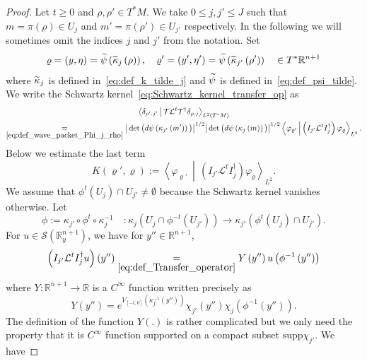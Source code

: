 \documentclass[AHL,Unicode,longabstracts,published]{cedram}
\newcommand{\clS}{\mathcal{S}}
\newcommand{\clT}{\mathcal{T}}
\newcommand{\clL}{\mathcal{L}}
\newcommand{\supp}{\mathrm{supp}}
\newcommand{\bbR}{\mathbb{R}}
\let\oldtilde\tilde
\renewcommand*{\tilde}[1]{\mathchoice{\widetilde{#1}}{\widetilde{#1}}{\oldtilde{#1}}{\oldtilde{#1}}}
\newcommand{\bbR}{\mathbb{R}}
\begin{document}
\begin{proof}
Let $t\geq0$ and $\rho,\rho'\in T^{*}M$. We take $0\leq j,j'\leq J$ such that $m=\pi(\rho)\in U_{j}$ and $m'=\pi(\rho')\in U_{j'}$ respectively. In the following we will sometimes omit the indices $j$ and $j'$ from the notation. Set
\[
\varrho=\left(y,\eta\right)=\tilde{\psi}\left(\tilde{\kappa}_{j}\left(\rho\right)\right),\quad\varrho'=\left(y',\eta'\right)=\tilde{\psi}\left(\tilde{\kappa}_{j'}\left(\rho'\right)\right)\quad\in T^{*}\bbR^{n+1}
\]
where $\tilde{\kappa}_{j}$ is defined in~\eqref{eq:def_k_tilde_j} and $\tilde{\psi}$ is defined in~\eqref{eq:def_psi_tilde}. We write the Schwartz kernel~\eqref{eq:Schwartz_kernel_transfer_op} as
\begin{multline}\label{eq:kernel}
\left\langle\delta_{\rho',j'}\,\middle|\,\clT\clL^{t}\clT^{\dagger}\delta_{\rho,j}\right\rangle_{L^{2}\left(T^{*}M\right)}\\
\underset{\eqref{eq:def_wave_packet_Phi_j_rho}}{=}\big|\det \big(d\psi\left(\kappa_{j'}\left(m'\right)\right)\big)\big|^{1/2}\big|\det \big(d\psi\left(\kappa_{j}\left(m\right)\right)\big)\big|^{1/2}\left\langle\varphi_{\varrho'}\,\middle|\,\left(I_{j'}\clL^{t}I_{j}^{\dagger}\right)\varphi_{\varrho}\right\rangle_{L^{2}}.
\end{multline}
Below we estimate the last term
\begin{equation}\label{eq:def_K}
K\left(\varrho',\varrho\right):=\left\langle\varphi_{\varrho'}\,\middle|\,\left(I_{j'}\clL^{t}I_{j}^{\dagger}\right)\varphi_{\varrho}\right\rangle_{L^{2}}.
\end{equation}
We assume that $\phi^{t}(U_{j})\cap U_{j'}\neq\emptyset$ because the Schwartz kernel vanishes otherwise. Let
\[
\phi:=\kappa_{j'}\circ\phi^{t}\circ\kappa_{j}^{-1}\quad:\kappa_{j}\left(U_{j}\cap\phi^{-t}\left(U_{j'}\right)\right)\rightarrow\kappa_{j'}\left(\phi^{t}\left(U_{j}\right)\cap U_{j'}\right).
\]
For $u\in\clS(\bbR_{y}^{n+1})$, we have for $y''\in\bbR^{n+1}$,
\begin{equation}
\left(I_{j'}\clL^{t}I_{j}^{\dagger}u\right)\left(y''\right)\underset{\eqref{eq:def_Transfer_operator}}{=}Y\left(y''\right)u\left(\phi^{-1}\left(y''\right)\right)\label{eq:def_Ltilde-1}
\end{equation}
where $Y:\bbR^{n+1}\to\bbR$ is a $C^{\infty}$ function written precisely as
\[
Y\left(y''\right)=e^{V_{\left[-t,0\right]}\left(\kappa_{j'}^{-1}\left(y''\right)\right)}\chi_{j'}\left(y''\right)\chi_{j}\left(\phi^{-1}\left(y''\right)\right).
\]
The definition of the function $Y(.)$ is rather complicated but we only need the property that it is $C^{\infty}$ function supported on a compact subset $\supp\chi_{j'}$. We have

\end{proof}
\end{document}
